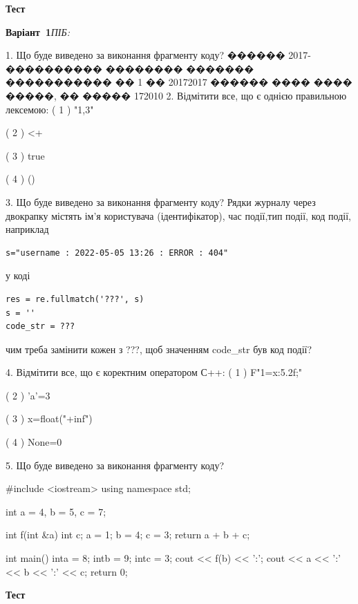 \documentclass[11pt]{article}
\begin{document}
{\large\textbf{Тест}}

\textbf{Варіант \No\,1}\hfill \textit{ПІБ:}\,\underline{\hspace{60mm}}
\vspace{4mm}

1. Що буде виведено за виконання фрагменту коду?
������ 2017-���������� �������� ������� ����������� �� 1 �� 20172017 ������ ���� ���� �����, �� ����� 172010
2. %
Відмітити все, що є однією правильною лексемою:
( 1 ) "1,3"

( 2 ) <+

( 3 ) true

( 4 ) ()

3. Що буде виведено за виконання фрагменту коду?
Рядки журналу через двокрапку містять ім'я користувача (ідентифікатор), час події,тип події, код події, наприклад
\begin{verbatim}
s="username : 2022-05-05 13:26 : ERROR : 404"
\end{verbatim}
у коді 
\begin{verbatim}
res = re.fullmatch('???', s) 
s = ''
code_str = ??? 
\end{verbatim}
чим треба замінити кожен з ???, щоб значенням code\_str був код події? 



4. %
Відмітити все, що є коректним оператором С++:
( 1 ) F"1={x:5.2f};"

( 2 ) 'a'=3

( 3 ) x=float("+inf")

( 4 ) None=0

5. Що буде виведено за виконання фрагменту коду?

#include <iostream>
using namespace std;

int a = 4, b = 5, c = 7;

int f(int &a){
int c;    a = 1;
    b = 4;
    c = 3;
    return a + b + c;
}

int main(){
    inta = 8;
    intb = 9;
    intc = 3;
    cout << f(b) << ':';
    cout << a << ':' << b << ':' << c;
    return 0; 
}






\newpage

\newpage

{\large\textbf{Тест}}
\end{document}
